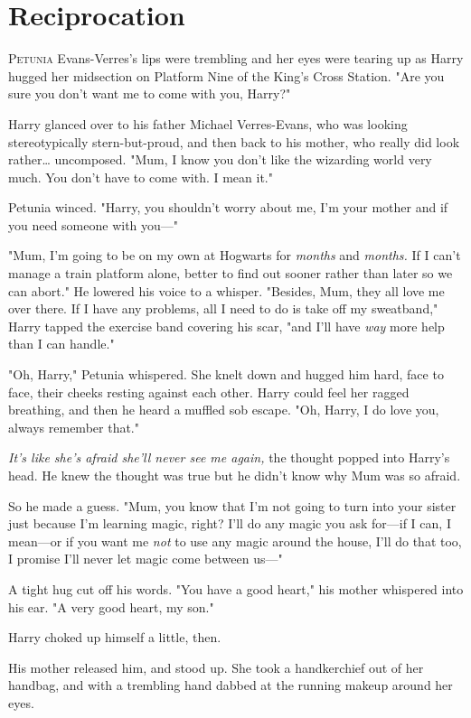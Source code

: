 \chapter{Reciprocation}

\lettrine{P}{etunia} Evans-Verres's lips were trembling and her eyes were tearing up as
Harry hugged her midsection on Platform Nine of the King's Cross Station. "Are
you sure you don't want me to come with you, Harry?"

Harry glanced over to his father Michael Verres-Evans, who was looking
stereotypically stern-but-proud, and then back to his mother, who really did
look rather{\ldots} uncomposed. "Mum, I know you don't like the wizarding world
very much. You don't have to come with. I mean it."

Petunia winced. "Harry, you shouldn't worry about me, I'm your mother and if
you need someone with you---"

"Mum, I'm going to be on my own at Hogwarts for \emph{months} and
\emph{months.} If I can't manage a train platform alone, better to find out
sooner rather than later so we can abort." He lowered his voice to a whisper.
"Besides, Mum, they all love me over there. If I have any problems, all I need
to do is take off my sweatband," Harry tapped the exercise band covering his
scar, "and I'll have \emph{way} more help than I can handle."

"Oh, Harry," Petunia whispered. She knelt down and hugged him hard, face to
face, their cheeks resting against each other. Harry could feel her ragged
breathing, and then he heard a muffled sob escape. "Oh, Harry, I do love you,
always remember that."

\emph{It's like she's afraid she'll never see me again,} the thought popped
into Harry's head. He knew the thought was true but he didn't know why Mum was
so afraid.

So he made a guess. "Mum, you know that I'm not going to turn into your sister
just because I'm learning magic, right? I'll do any magic you ask for---if I
can, I mean---or if you want me \emph{not} to use any magic around the house,
I'll do that too, I promise I'll never let magic come between us---"

A tight hug cut off his words. "You have a good heart," his mother whispered
into his ear. "A very good heart, my son."

Harry choked up himself a little, then.

His mother released him, and stood up. She took a handkerchief out of her
handbag, and with a trembling hand dabbed at the running makeup around her eyes.

